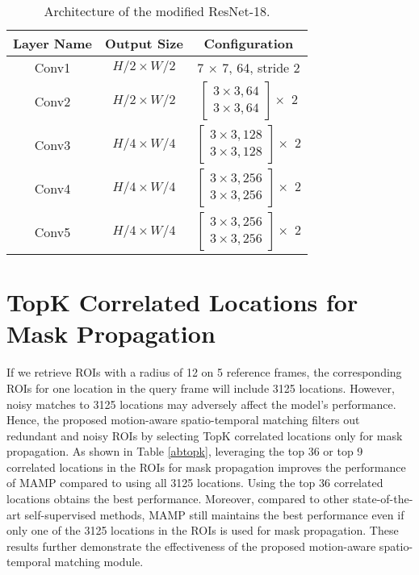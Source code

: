 \documentclass[letterpaper]{article} \usepackage{aaai22}  \usepackage{times}  \usepackage{helvet}  \usepackage{courier}  \usepackage[hyphens]{url}  \usepackage{graphicx} \urlstyle{rm} \def\UrlFont{\rm}  \usepackage{natbib}  \usepackage{caption} \DeclareCaptionStyle{ruled}{labelfont=normalfont,labelsep=colon,strut=off} \frenchspacing  \setlength{\pdfpagewidth}{8.5in}  \setlength{\pdfpageheight}{11in}  \usepackage{algorithm}
\begin{document}
\begin{table}[h]
\centering
\begin{tabular}{ccc}
\toprule[1.5pt]
Layer Name & Output Size & Configuration \\
\hline
Conv1 & $H/2 \times W/2$ & 7 $\times$ 7, 64, stride 2\\
Conv2 & $H/2 \times W/2$ & $
\begin{bmatrix} 3 \times 3, 64 \\ 3 \times 3, 64 \end{bmatrix} \times$ 2 \\
Conv3 & $H/4 \times W/4$ & $
\begin{bmatrix} 3 \times 3, 128 \\ 3 \times 3, 128 \end{bmatrix} \times$ 2 \\
Conv4 & $H/4 \times W/4$ & $
\begin{bmatrix} 3 \times 3, 256 \\ 3 \times 3, 256 \end{bmatrix} \times$ 2 \\
Conv5 & $H/4 \times W/4$ & $
\begin{bmatrix} 3 \times 3, 256 \\ 3 \times 3, 256 \end{bmatrix} \times$ 2 \\
\toprule[1.5pt]
\end{tabular}
\caption{Architecture of the modified ResNet-18.}
\label{resnet}
\end{table}



\section{TopK Correlated Locations for Mask Propagation}
\vspace{2mm}

If we retrieve ROIs with a radius of 12 on 5 reference frames, the corresponding ROIs for one location in the query frame will include 3125 locations. However, noisy matches to 3125 locations may adversely affect the model's performance. Hence, the proposed motion-aware spatio-temporal matching filters out redundant and noisy ROIs by selecting TopK correlated locations only for mask propagation. As shown in Table \ref{abtopk}, leveraging the top 36 or top 9 correlated locations in the ROIs for mask propagation improves the performance of MAMP compared to using all 3125 locations. Using the top 36 correlated locations obtains the best performance. Moreover, compared to other {state-of-the-art self-supervised} methods, MAMP still maintains the best performance even if only one of the 3125 locations in the ROIs is used for mask propagation. These results further demonstrate the effectiveness of the proposed motion-aware spatio-temporal matching module.
\end{document}

